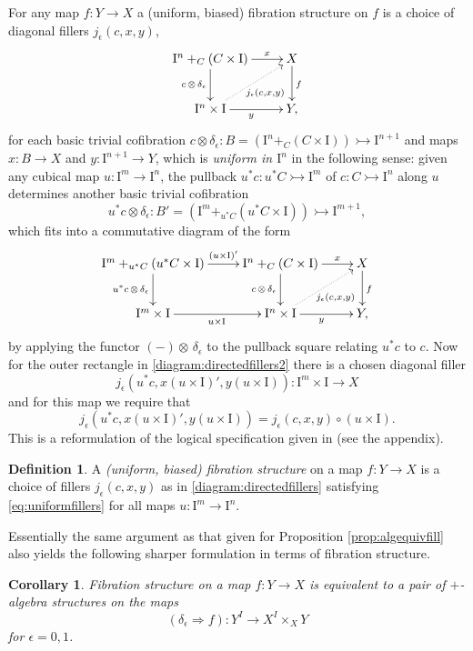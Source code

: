 \documentclass[11pt]{article}
\newcommand{\mono}{\ensuremath{\rightarrowtail}}
\newcommand{\ra}{\ensuremath{\rightarrow}}
\newcommand{\I}{\ensuremath{\mathrm{I}}}
\newtheorem{corollary}[theorem]{Corollary}
\theoremstyle{remark}
\theoremstyle{definition}
\newtheorem{definition}[theorem]{Definition}
\begin{document}
For any map $f:Y\to X$  a (uniform, biased) fibration structure on $f$ is a choice of diagonal fillers $j_\epsilon(c,x,y)$,
\begin{equation}\label{diagram:directedfillers}
\xymatrix{
\I^n +_C (C\times\I) \ar[d]_{c\,\otimes\,\delta_\epsilon} \ar[r]^-{x} & X \ar[d]^f \\
\I^{n}\times \I \ar@{.>}[ru]_{j_\epsilon(c,x,y)} \ar[r]_y & Y,
}
\end{equation}
for each basic trivial cofibration $c \otimes \delta_\epsilon : B = (\I^n +_C (C\times\I)) \mono \I^{n+1}$ and maps $x : B\to X$ and $y : \I^{n+1}\to Y$, which is \emph{uniform in $\I^{n}$} in the following sense: given any cubical map $u : \I^m \to \I^n$, the pullback $u^*c : u^*C\mono \I^m$ of $c : C\mono \I^n$ along $u$ determines another basic trivial cofibration $$u^*c \otimes \delta_\epsilon : B' = (\I^m +_{u^*C} (u^*C\times\I)) \mono \I^{m+1},$$ which fits into a commutative diagram of the form
\begin{equation}\label{diagram:directedfillers2}
\xymatrix{
\I^m +_{u^*C} (u^*C\times\I) \ar[d]_{u^*c\,\otimes\,\delta_\epsilon} \ar[r]^-{(u\times\I)'} & \I^n +_C (C\times\I) \ar[d]_{c\,\otimes\,\delta_\epsilon} \ar[r]^-{x} & X \ar[d]^f \\
\I^{m}\times \I  \ar[r]_{u\times \I} & \I^{n}\times \I \ar@{.>}[ru]_{j_\epsilon(c,x,y)} \ar[r]_{y} & Y,
}
\end{equation}
by applying the functor $(-)\otimes\,\delta_\epsilon$ to the pullback square relating $u^*c$ to $c$.  Now for the outer rectangle in \eqref{diagram:directedfillers2} there is a chosen diagonal filler $$j_\epsilon(u^*c,x(u\times\I)', y(u\times\I)): \I^m\times\I\to X$$ and for this map we require that
\begin{equation}\label{eq:uniformfillers}
j_\epsilon(u^*c,x(u\times\I)', y(u\times\I)) = j_\epsilon(c,x,y)\circ(u\times \I).
\end{equation}
This is a reformulation of the logical specification given in \cite{CCHM} (see the appendix).

\begin{definition}\label{def:uniform} A \emph{(uniform, biased) fibration structure} on a map $f: Y\ra X$ is a choice of fillers $j_\epsilon(c,x,y)$ as in \eqref{diagram:directedfillers} satisfying \eqref{eq:uniformfillers} for all maps $u : \I^m\ra\I^n$.
\end{definition}

Essentially the same argument as that given for Proposition \ref{prop:algequivfill} also yields the following sharper formulation in terms of fibration structure.
\begin{corollary}\label{cor:fibstrequivplustr}
Fibration structure on a map $f : Y\ra X$ is equivalent to a pair of $+$-algebra structures on the maps $$(\delta_\epsilon\Rightarrow{f}) : Y^I \to X^I\times_X Y$$ for $\epsilon = 0,1$.
\end{corollary}
\end{document}
